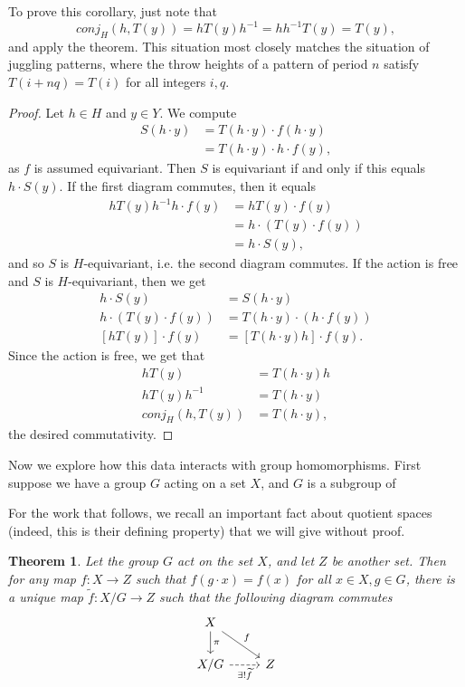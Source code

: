 \documentclass[12nt]{article}
\theoremstyle{plain}
\newtheorem{theorem}{Theorem}
\begin{document}
To prove this corollary, just note that \[
conj_H(h, T(y)) = hT(y)h^{-1} = hh^{-1}T(y) = T(y),
\]
and apply the theorem. This situation most closely matches the situation of juggling patterns, where the throw heights of a pattern of period $n$ satisfy \newline $T(i + nq) = T(i)$ for all integers $i, q$. 

\begin{proof}
Let $h \in H$ and $y \in Y$. We compute
\begin{align*}
S(h \cdot y) &= T(h \cdot y) \cdot f(h \cdot y) \\
	&= T(h \cdot y) \cdot h \cdot f(y),
\end{align*}
as $f$ is assumed equivariant. Then $S$ is equivariant if and only if this equals $h \cdot S(y)$. If the first diagram commutes, then it equals 
\begin{align*}
hT(y)h^{-1}h \cdot f(y) &= hT(y) \cdot f(y) \\
	&= h \cdot (T(y) \cdot f(y)) \\
	&= h \cdot S(y),
\end{align*}
and so $S$ is $H$-equivariant, i.e. the second diagram commutes. If the action is free and $S$ is $H$-equivariant, then we get 
\begin{align*}
h \cdot S(y) &= S(h \cdot y) \\
h \cdot (T(y) \cdot f(y)) &= T(h \cdot y) \cdot (h \cdot f(y)) \\
[hT(y)] \cdot f(y) &= [T(h \cdot y)h] \cdot f(y).
\end{align*}
Since the action is free, we get that 
\begin{align*}
hT(y) &= T(h \cdot y) h \\
hT(y)h^{-1} &= T(h \cdot y) \\
conj_H(h, T(y)) &= T(h \cdot y),
\end{align*}
the desired commutativity. 
\end{proof}

Now we explore how this data interacts with group homomorphisms. First suppose we have a group $G$ acting on a set $X$, and $G$ is a subgroup of 

For the work that follows, we recall an important fact about quotient spaces (indeed, this is their defining property) that we will give without proof.
\begin{theorem}
Let the group $G$ act on the set $X$, and let $Z$ be another set. Then for any map $f : X \to Z$ such that $f(g \cdot x) = f(x)$ for all $x \in X, g \in G$, there is a unique map $\widetilde{f} : X/G \to Z$ such that the following diagram commutes
\[
\begin{tikzcd}
X\ar[d, "\pi"] \ar[dr, "f"]  \\
X/G \ar[r, "\exists ! \widetilde{f}"', dashed] & Z
\end{tikzcd}
\]
\end{theorem}
\end{document}

